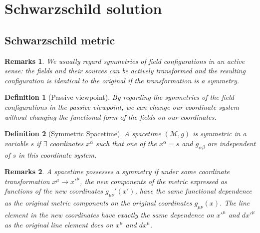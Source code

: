 \documentclass[a4paper]{article}
\newtheorem{remarks}{Remarks}[section]
\theoremstyle{new}
\newtheorem{defi}{Definition}[section]
\begin{document}
\newpage
\section{Schwarzschild solution}
\subsection{Schwarzschild metric}
\begin{remarks}
We usually regard symmetries of field configurations in an active sense: the fields and their sources can be actively transformed and the resulting configuration is identical to the original if the transformation is a symmetry.
\end{remarks}
\begin{defi}[Passive viewpoint]
By regarding the symmetries of the field configurations in the passive viewpoint, we can change our coordinate system without changing the functional form of the fields on our coordinates.
\end{defi}
\begin{defi}[Symmetric Spacetime]
A spacetime $(\mathcal{M},g)$ is symmetric in a variable $s$ if $\exists$ coordinates $x^\alpha$ such that one of the $x^\alpha=s$ and $g_{\alpha\beta}$ are independent of $s$ in this coordinate system. 
\end{defi}
\begin{remarks}
A spacetime possesses a symmetry if under some coordinate transformation $x^\mu\rightarrow x'^\mu$, the new components of the metric expressed as functions of the new coordinates $g_{\mu\nu}'(x')$, have the same functional dependence as the original metric components on the original coordinates $g_{\mu\nu}(x)$. The line element in the new coordinates have exactly the same dependence on $x'^\mu$ and $dx'^\mu$ as the original line element does on $x^\mu$ and $dx^\mu$.
\end{remarks}
\end{document}
